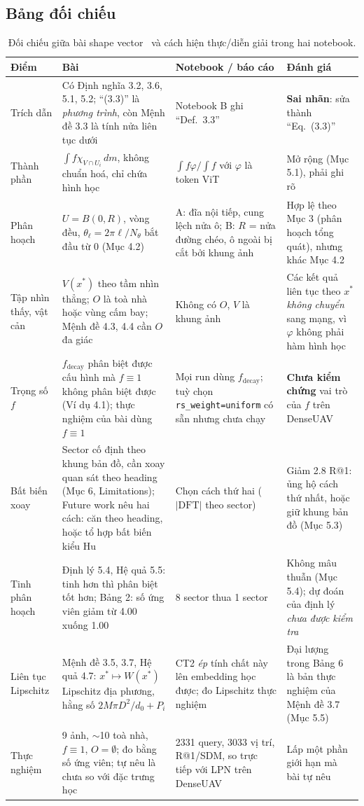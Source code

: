 \documentclass[11pt,a4paper]{article}
\newcommand{\dd}{\,dm}
\begin{document}
\subsection{Bảng đối chiếu}
\begin{table}[h]\centering\small
\caption{Đối chiếu giữa bài shape vector~\cite{huu2026} và cách hiện thực/diễn giải trong hai notebook.}\label{tab:doichieu}
\begin{tabular}{@{}p{2.6cm}p{4.7cm}p{4.3cm}p{3.6cm}@{}}\toprule
Điểm & Bài~\cite{huu2026} & Notebook / báo cáo & Đánh giá\\\midrule
Trích dẫn & Có Định nghĩa 3.2, 3.6, 5.1, 5.2; ``(3.3)'' là \emph{phương trình}, còn Mệnh đề 3.3 là tính nửa liên tục dưới & Notebook B ghi ``Def.~3.3'' & \textbf{Sai nhãn}: sửa thành ``Eq.~(3.3)''\\
Thành phần & $\int f\chi_{V\cap U_i}\dd$, không chuẩn hoá, chỉ chứa hình học & $\int f\varphi/\int f$ với $\varphi$ là token ViT & Mở rộng (Mục 5.1), phải ghi rõ\\
Phân hoạch & $U=B(0,R)$, vòng đều, $\theta_\ell=2\pi\ell/N_\theta$ bắt đầu từ $0$ (Mục 4.2) & A: đĩa nội tiếp, cung lệch nửa ô; B: $R$ = nửa đường chéo, ô ngoài bị cắt bởi khung ảnh & Hợp lệ theo Mục 3 (phân hoạch tổng quát), nhưng khác Mục 4.2\\
Tập nhìn thấy, vật cản & $V(x^*)$ theo tầm nhìn thẳng; $O$ là toà nhà hoặc vùng cấm bay; Mệnh đề 4.3, 4.4 cần $O$ đa giác & Không có $O$, $V$ là khung ảnh & Các kết quả liên tục theo $x^*$ \emph{không chuyển} sang mạng, vì $\varphi$ không phải hàm hình học\\
Trọng số $f$ & $f_{\mathrm{decay}}$ phân biệt được cấu hình mà $f\equiv1$ không phân biệt được (Ví dụ 4.1); thực nghiệm của bài dùng $f\equiv1$ & Mọi run dùng $f_{\mathrm{decay}}$; tuỳ chọn \texttt{rs\_weight=uniform} có sẵn nhưng chưa chạy & \textbf{Chưa kiểm chứng} vai trò của $f$ trên DenseUAV\\
Bất biến xoay & Sector cố định theo khung bản đồ, cần xoay quan sát theo heading (Mục 6, Limitations); Future work nêu hai cách: căn theo heading, hoặc tổ hợp bất biến kiểu Hu~\cite{hu1962} & Chọn cách thứ hai ($|\mathrm{DFT}|$ theo sector) & Giảm 2.8 R@1: ủng hộ cách thứ nhất, hoặc giữ khung bản đồ (Mục 5.3)\\
Tinh phân hoạch & Định lý 5.4, Hệ quả 5.5: tinh hơn thì phân biệt tốt hơn; Bảng 2: số ứng viên giảm từ 4.00 xuống 1.00 & 8 sector thua 1 sector & Không mâu thuẫn (Mục 5.4); dự đoán của định lý \emph{chưa được kiểm tra}\\
Liên tục Lipschitz & Mệnh đề 3.5, 3.7, Hệ quả 4.7: $x^*\mapsto W(x^*)$ Lipschitz địa phương, hằng số $2M\pi D^2/d_0+P_i$ & CT2 \emph{ép} tính chất này lên embedding học được; đo Lipschitz thực nghiệm & Đại lượng trong Bảng 6 là bản thực nghiệm của Mệnh đề 3.7 (Mục 5.5)\\
Thực nghiệm & 9 ảnh, $\sim$10 toà nhà, $f\equiv1$, $O=\emptyset$; đo bằng số ứng viên; tự nêu là chưa so với đặc trưng học~\cite{lpn,dai2024} & 2331 query, 3033 vị trí, R@1/SDM, so trực tiếp với LPN trên DenseUAV & Lấp một phần giới hạn mà bài tự nêu\\\bottomrule
\end{tabular}
\end{table}
\end{document}
